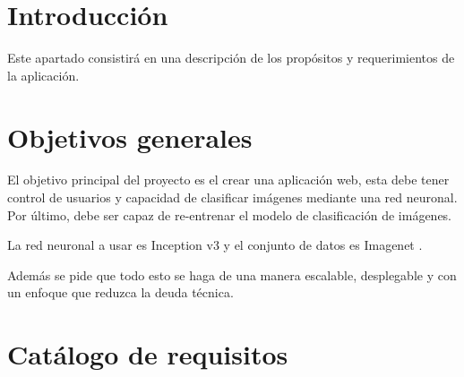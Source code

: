 
\section{Introducción}
Este apartado consistirá en una descripción de los propósitos y requerimientos de la aplicación.

\section{Objetivos generales}
El objetivo principal del proyecto es el crear una aplicación web, esta debe tener control de usuarios y capacidad de clasificar imágenes mediante una red neuronal. Por último, debe ser capaz de re-entrenar el modelo de clasificación de imágenes.

La red neuronal a usar es Inception v3 \cite{incep} y el conjunto de datos es Imagenet \cite{imnet}.

Además se pide que todo esto se haga de una manera escalable, desplegable y con un enfoque que reduzca la deuda técnica.

\section{Catálogo de requisitos}
